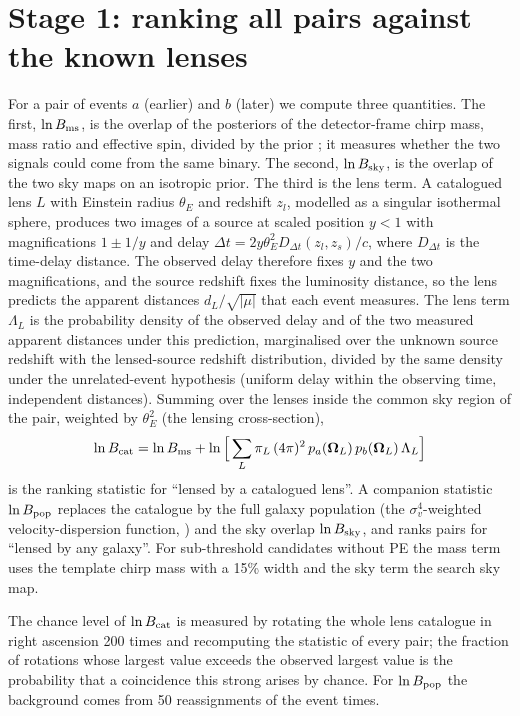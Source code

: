 \section{Stage 1: ranking all pairs against the known lenses}
\label{sec:stage1}
For a pair of events $a$ (earlier) and $b$ (later) we compute three quantities. The first, $\ln B_{\rm ms}$, is the overlap of the posteriors of the detector-frame chirp mass, mass ratio and effective spin, divided by the prior \citep{haris2018identifying}; it measures whether the two signals could come from the same binary. The second, $\ln B_{\rm sky}$, is the overlap of the two sky maps on an isotropic prior. The third is the lens term. A catalogued lens $L$ with Einstein radius $\theta_E$ and redshift $z_l$, modelled as a singular isothermal sphere, produces two images of a source at scaled position $y<1$ with magnifications $1\pm1/y$ and delay $\Delta t=2y\theta_E^2D_{\Delta t}(z_l,z_s)/c$, where $D_{\Delta t}$ is the time-delay distance. The observed delay therefore fixes $y$ and the two magnifications, and the source redshift fixes the luminosity distance, so the lens predicts the apparent distances $d_L/\sqrt{|\mu|}$ that each event measures. The lens term $\Lambda_L$ is the probability density of the observed delay and of the two measured apparent distances under this prediction, marginalised over the unknown source redshift with the lensed-source redshift distribution, divided by the same density under the unrelated-event hypothesis (uniform delay within the observing time, independent distances). Summing over the lenses inside the common sky region of the pair, weighted by $\theta_E^2$ (the lensing cross-section),
\begin{equation}
\ln B_{\rm cat}=\ln B_{\rm ms}+\ln\Big[\sum_L\pi_L\,(4\pi)^2\,p_a(\boldsymbol\Omega_L)\,p_b(\boldsymbol\Omega_L)\,\Lambda_L\Big]
\label{eq:bcat}
\end{equation}
is the ranking statistic for ``lensed by a catalogued lens''. A companion statistic $\ln B_{\rm pop}$ replaces the catalogue by the full galaxy population (the $\sigma_v^4$-weighted velocity-dispersion function, \citep{choi2007vdf}) and the sky overlap $\ln B_{\rm sky}$, and ranks pairs for ``lensed by any galaxy''. For sub-threshold candidates without PE the mass term uses the template chirp mass with a 15\% width and the sky term the search sky map.

The chance level of $\ln B_{\rm cat}$ is measured by rotating the whole lens catalogue in right ascension 200 times and recomputing the statistic of every pair; the fraction of rotations whose largest value exceeds the observed largest value is the probability that a coincidence this strong arises by chance. For $\ln B_{\rm pop}$ the background comes from 50 reassignments of the event times.

